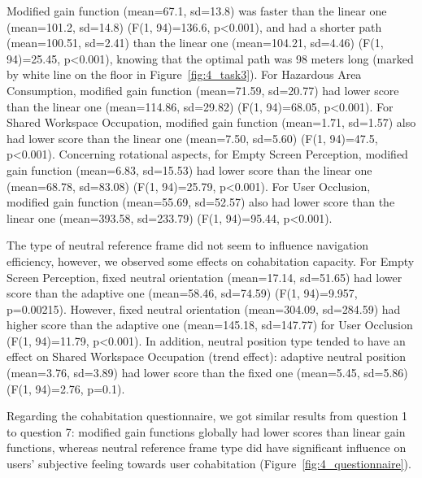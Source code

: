 Modified gain function (mean=67.1, sd=13.8) was faster than the linear one (mean=101.2, sd=14.8) (F(1, 94)=136.6, p\textless 0.001), and had a shorter path (mean=100.51, sd=2.41) than the linear one (mean=104.21, sd=4.46) (F(1, 94)=25.45, p\textless 0.001), knowing that the optimal path was 98 meters long (marked by white line on the floor in Figure~\ref{fig:4_task3}). For Hazardous Area Consumption, modified gain function (mean=71.59, sd=20.77) had lower score than the linear one (mean=114.86, sd=29.82) (F(1, 94)=68.05, p\textless 0.001). For Shared Workspace Occupation, modified gain function (mean=1.71, sd=1.57) also had lower score than the linear one (mean=7.50, sd=5.60) (F(1, 94)=47.5, p\textless 0.001). Concerning rotational aspects, for Empty Screen Perception, modified gain function (mean=6.83, sd=15.53) had lower score than the linear one (mean=68.78, sd=83.08) (F(1, 94)=25.79, p\textless 0.001). For User Occlusion, modified gain function (mean=55.69, sd=52.57) also had lower score than the linear one (mean=393.58, sd=233.79) (F(1, 94)=95.44, p\textless 0.001).

The type of neutral reference frame did not seem to influence navigation efficiency, however, we observed some effects on cohabitation capacity. For Empty Screen Perception, fixed neutral orientation (mean=17.14, sd=51.65) had lower score than the adaptive one (mean=58.46, sd=74.59) (F(1, 94)=9.957, p=0.00215). However, fixed neutral orientation (mean=304.09, sd=284.59) had higher score than the adaptive one (mean=145.18, sd=147.77) for User Occlusion (F(1, 94)=11.79, p\textless 0.001). In addition, neutral position type tended to have an effect on Shared Workspace Occupation (trend effect): adaptive neutral position (mean=3.76, sd=3.89) had lower score than the fixed one (mean=5.45, sd=5.86) (F(1, 94)=2.76, p=0.1).

Regarding the cohabitation questionnaire, we got similar results from question 1 to question 7: modified gain functions globally had lower scores than linear gain functions, whereas neutral reference frame type did have significant influence on users' subjective feeling towards user cohabitation (Figure~\ref{fig:4_questionnaire}).

